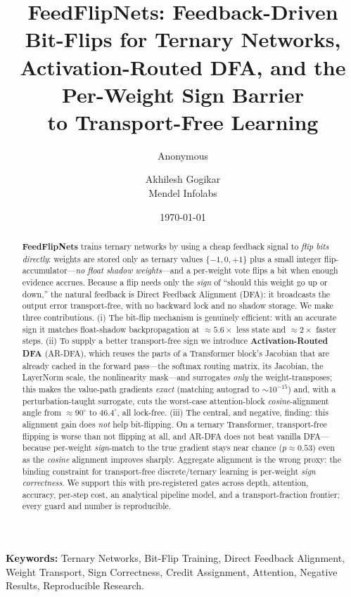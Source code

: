 \documentclass[11pt]{article}
\title{FeedFlipNets: Feedback-Driven Bit-Flips for Ternary Networks,\\ Activation-Routed DFA, and the Per-Weight Sign Barrier\\ to Transport-Free Learning}
\author{Anonymous}
\date{}
\author{Akhilesh Gogikar\\ Mendel Infolabs}
\date{\today}
\newcommand{\ARDFA}{\textsc{AR-DFA}}
\newenvironment{keywords}{\par\small\noindent\textbf{Keywords:} }{\par}
\begin{document}
\maketitle

\begin{abstract}
\textbf{FeedFlipNets} trains ternary networks by using a cheap feedback signal to \emph{flip bits directly}: weights are stored only as ternary values $\{-1,0,+1\}$ plus a small integer flip-accumulator---\emph{no float shadow weights}---and a per-weight vote flips a bit when enough evidence accrues. Because a flip needs only the \emph{sign} of ``should this weight go up or down,'' the natural feedback is Direct Feedback Alignment (DFA): it broadcasts the output error transport-free, with no backward lock and no shadow storage. We make three contributions. (i) The bit-flip mechanism is genuinely efficient: with an accurate sign it matches float-shadow backpropagation at $\approx\!5.6\times$ less state and $\approx\!2\times$ faster steps. (ii) To supply a better transport-free sign we introduce \textbf{Activation-Routed DFA} (\ARDFA), which reuses the parts of a Transformer block's Jacobian that are already cached in the forward pass---the softmax routing matrix, its Jacobian, the LayerNorm scale, the nonlinearity mask---and surrogates \emph{only} the weight-transposes; this makes the value-path gradients \emph{exact} (matching autograd to $\sim\!10^{-15}$) and, with a perturbation-taught surrogate, cuts the worst-case attention-block \emph{cosine}-alignment angle from $\approx\!90^{\circ}$ to $46.4^{\circ}$, all lock-free. (iii) The central, and negative, finding: this alignment gain does \emph{not} help bit-flipping. On a ternary Transformer, transport-free flipping is worse than not flipping at all, and \ARDFA{} does not beat vanilla DFA---because per-weight \emph{sign}-match to the true gradient stays near chance ($p\!\approx\!0.53$) even as the \emph{cosine} alignment improves sharply. Aggregate alignment is the wrong proxy: the binding constraint for transport-free discrete/ternary learning is per-weight \emph{sign correctness}. We support this with pre-registered gates across depth, attention, accuracy, per-step cost, an analytical pipeline model, and a transport-fraction frontier; every guard and number is reproducible.
\end{abstract}
\begin{keywords}
Ternary Networks, Bit-Flip Training, Direct Feedback Alignment, Weight Transport, Sign Correctness, Credit Assignment, Attention, Negative Results, Reproducible Research.
\end{keywords}
\end{document}
